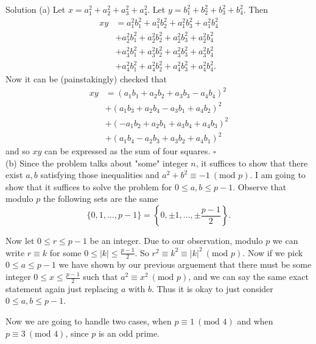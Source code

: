\documentclass{article}
\begin{document}
\begin{solution}{Solution}
(a) Let $x = a_1^2 + a_2^2 + a_3^2 + a_4^2$. Let
$y = b_1^2 + b_2^2 + b_3^2 + b_4^2$. Then
\[
\begin{aligned}
xy &= a_1^2 b_1^2 + a_1^2 b_2^2 + a_1^2 b_3^2 + a_1^2 b_4^2 \\
   &+ a_2^2 b_1^2 + a_2^2 b_2^2 + a_2^2 b_3^2 + a_2^2 b_4^2 \\
   &+ a_3^2 b_1^2 + a_3^2 b_2^2 + a_3^2 b_3^2 + a_3^2 b_4^2 \\
   &+ a_4^2 b_1^2 + a_4^2 b_2^2 + a_4^2 b_3^2 + a_4^2 b_4^2.
\end{aligned}
\]
Now it can be (painstakingly) checked that
\[
\begin{aligned}
xy &= (a_1 b_1 + a_2 b_2 + a_3 b_3 - a_4 b_4)^2 \\
&+ (a_1 b_3 + a_2 b_4 - a_3 b_1 + a_4 b_2)^2 \\
&+ (-a_1 b_2 + a_2 b_1 + a_3 b_4 + a_4 b_3)^2 \\
&+ (a_1 b_4 - a_2 b_3 + a_3 b_2 + a_4 b_1)^2
\end{aligned}
\]
and so $xy$ can be expressed as the sum of four squares. $\square$
\\

(b)
Since the problem talks about "some" integer $n$, it suffices to show that
there exist $a,b$ satisfying those inequalities and
$a^2 + b^2 \equiv -1 \ (\text{mod } p)$.
I am going to show that it suffices to solve the problem for
$0 \leq a,b \leq p-1$. Observe that modulo $p$ the following sets are the
same
$$
\{ 0,1,\ldots,p-1 \} = \left\{ 0, \pm1, \ldots, \pm\frac{p-1}{2} \right\}.
$$

Now let $0 \leq r \leq p-1$ be an integer. Due to our observation, modulo $p$
we can write $r \equiv k$ for some $0 \leq |k| \leq \frac{p-1}{2}$.
So $r^2 \equiv k^2 \equiv |k|^2 \ (\text{mod } p)$. Now if we pick
$0 \leq a \leq p-1$ we have shown by our previous arguement that there
must be some integer $0 \leq x \leq \frac{p-1}{2}$ such that
$a^2 \equiv x^2 \ (\text{mod } p)$, and we can say the same exact statement
again just replacing $a$ with $b$. Thus it is okay to just consider
$0 \leq a,b \leq p-1$. \vspace{0.2cm}

Now we are going to handle two cases, when $p \equiv 1 \ (\text{mod } 4)$
and when $p \equiv 3 \ (\text{mod } 4)$, since $p$ is an odd prime.
\\

{\color{gray} \hline}
\vspace{0.2cm}


\end{solution}
\end{document}
